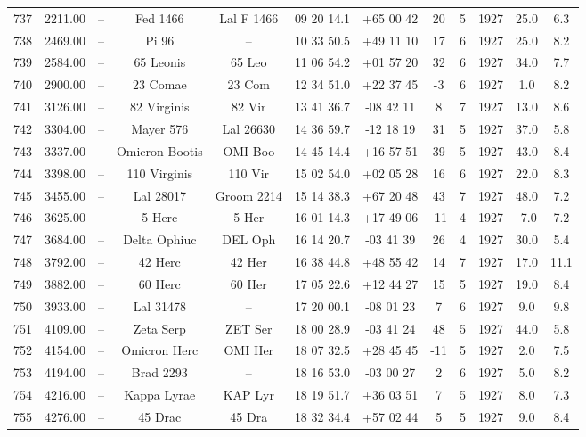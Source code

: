 \begin{table}
\begin{tabular}{cccccccccccc}
737 & 2211.00 & -- & Fed 1466 & Lal F 1466 & 09 20 14.1 & +65 00 42 & 20 & 5 & 1927 & 25.0 & 6.3 \\
738 & 2469.00 & -- & Pi 96 & -- & 10 33 50.5 & +49 11 10 & 17 & 6 & 1927 & 25.0 & 8.2 \\
739 & 2584.00 & -- & 65 Leonis & 65 Leo & 11 06 54.2 & +01 57 20 & 32 & 6 & 1927 & 34.0 & 7.7 \\
740 & 2900.00 & -- & 23 Comae & 23 Com & 12 34 51.0 & +22 37 45 & -3 & 6 & 1927 & 1.0 & 8.2 \\
741 & 3126.00 & -- & 82 Virginis & 82 Vir & 13 41 36.7 & -08 42 11 & 8 & 7 & 1927 & 13.0 & 8.6 \\
742 & 3304.00 & -- & Mayer 576 & Lal 26630 & 14 36 59.7 & -12 18 19 & 31 & 5 & 1927 & 37.0 & 5.8 \\
743 & 3337.00 & -- & Omicron Bootis & OMI Boo & 14 45 14.4 & +16 57 51 & 39 & 5 & 1927 & 43.0 & 8.4 \\
744 & 3398.00 & -- & 110 Virginis & 110 Vir & 15 02 54.0 & +02 05 28 & 16 & 6 & 1927 & 22.0 & 8.3 \\
745 & 3455.00 & -- & Lal 28017 & Groom 2214 & 15 14 38.3 & +67 20 48 & 43 & 7 & 1927 & 48.0 & 7.2 \\
746 & 3625.00 & -- & 5 Herc & 5 Her & 16 01 14.3 & +17 49 06 & -11 & 4 & 1927 & -7.0 & 7.2 \\
747 & 3684.00 & -- & Delta Ophiuc & DEL Oph & 16 14 20.7 & -03 41 39 & 26 & 4 & 1927 & 30.0 & 5.4 \\
748 & 3792.00 & -- & 42 Herc & 42 Her & 16 38 44.8 & +48 55 42 & 14 & 7 & 1927 & 17.0 & 11.1 \\
749 & 3882.00 & -- & 60 Herc & 60 Her & 17 05 22.6 & +12 44 27 & 15 & 5 & 1927 & 19.0 & 8.4 \\
750 & 3933.00 & -- & Lal 31478 & -- & 17 20 00.1 & -08 01 23 & 7 & 6 & 1927 & 9.0 & 9.8 \\
751 & 4109.00 & -- & Zeta Serp & ZET Ser & 18 00 28.9 & -03 41 24 & 48 & 5 & 1927 & 44.0 & 5.8 \\
752 & 4154.00 & -- & Omicron Herc & OMI Her & 18 07 32.5 & +28 45 45 & -11 & 5 & 1927 & 2.0 & 7.5 \\
753 & 4194.00 & -- & Brad 2293 & -- & 18 16 53.0 & -03 00 27 & 2 & 6 & 1927 & 5.0 & 8.2 \\
754 & 4216.00 & -- & Kappa Lyrae & KAP Lyr & 18 19 51.7 & +36 03 51 & 7 & 5 & 1927 & 8.0 & 7.3 \\
755 & 4276.00 & -- & 45 Drac & 45 Dra & 18 32 34.4 & +57 02 44 & 5 & 5 & 1927 & 9.0 & 8.4 \\

\end{tabular}
\end{table}
